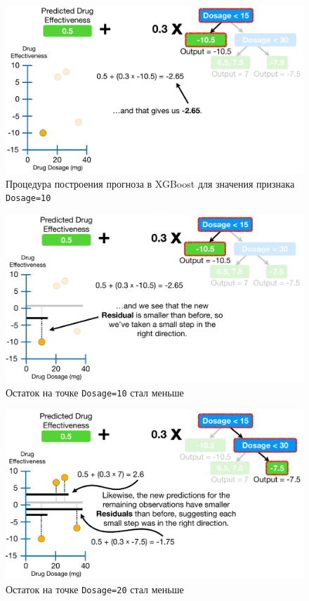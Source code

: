 \documentclass[%
	11pt,
	a4paper,
	utf8,
		]{article}
\begin{document}
\begin{figure}[h]
	\centering
	\includegraphics[scale=0.35]{figures/xgboost_pred.png}
	\caption{ Процедура построения прогноза в XGBoost для значения признака \texttt{Dosage=10} }\label{fig:xgboost_pred}
\end{figure}

\begin{figure}[h]
	\centering
	\includegraphics[scale=0.35]{figures/xgboost_pred2.png}
	\caption{ Остаток на точке \texttt{Dosage=10} стал меньше }\label{fig:xgboost_pred2}
\end{figure}

\begin{figure}[h]
	\centering
	\includegraphics[scale=0.35]{figures/xgboost_pred3.png}
	\caption{ Остаток на точке \texttt{Dosage=20} стал меньше }\label{fig:xgboost_pred3}
\end{figure}
\end{document}
